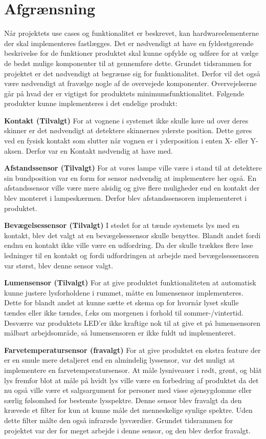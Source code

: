 \chapter{Afgrænsning}
\label{ch:afgraensning}

Når projektets use cases og funktionalitet er beskrevet, kan hardwareelementerne der skal implementeres fastlægges. Det er nødvendigt at have en fyldestgørende beskrivelse for de funktioner produktet skal kunne opfylde og udføre for at vælge de bedst mulige komponenter til at gennemføre dette. Grundet tidsrammen for projektet er det nødvendigt at begrænse sig for funktionalitet. Derfor vil det også være nødvendigt at fravælge nogle af de overvejede komponenter. Overvejelserne går på hvad der er vigtigst for produktets minimumsfunktionalitet.
Følgende produkter kunne implementeres i det endelige produkt:

\textbf{Kontakt (Tilvalgt)}
For at vognene i systemet ikke skulle køre ud over deres skinner er det nødvendigt at detektere skinnernes yderste position. Dette gøres ved en fysisk kontakt som slutter når vognen er i yderposition i enten X- eller Y-aksen. Derfor var en Kontakt nødvendig at have med. 

\textbf{Afstandssensor (Tilvalgt)}
For at vores lampe ville være i stand til at detektere sin bundposition var en form for sensor nødvendig at implementere her også. En afstandssensor ville være mere alsidig og give flere muligheder end en kontakt der blev monteret i lampeskærmen. Derfor blev afstandssensoren implementeret i produktet.

\textbf{Bevægelsessensor (Tilvalgt)}
I stedet for at tænde systemets lys med en kontakt, blev det valgt at en bevægelsessensor skulle benyttes. Blandt andet fordi endnu en kontakt ikke ville være en udfordring. Da der skulle trækkes flere løse ledninger til en kontakt og fordi udfordringen at arbejde med bevægelsessensoren var størst, blev denne sensor valgt.

\textbf{Lumensensor (Tilvalgt)}
For at give produktet funktionaliteten at automatisk kunne justere lysforholdene i rummet, måtte en lumensensor implementeres. Dette for blandt andet at kunne sætte et skema op for hvornår lyset skulle tændes eller ikke tændes, f.eks om morgenen i forhold til sommer-/vintertid. Desværre var produktets LED’er ikke kraftige nok til at give et på lumensensoren målbart arbejdsområde, så lumensensoren er ikke fuldt ud implementeret.

\textbf{Farvetemperatursensor (fravalgt)}
For at give produktet en ekstra feature der er en smule mere detaljeret end en almindelig lyssensor, var det muligt at implementere en farvetemperatursensor. At måle lysniveauer i rødt, grønt, og blåt lys fremfor blot at måle på hvidt lys ville være en forbedring af produktet da det nu også ville være et salgsargument for personer med visse øjensygdomme eller særlig følsomhed for bestemte lysspektre. Denne sensor blev fravalgt da den krævede et filter for kun at kunne måle det menneskelige synlige spektre. Uden dette filter målte den også infrarøde lysværdier. Grundet tidsrammen for projektet var der for meget arbejde i denne sensor, og den blev derfor fravalgt.  


